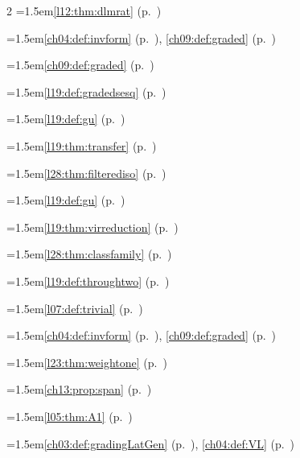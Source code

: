 \begin{multicols}{2}
\hangindent=1.5em\quad \ref{l12:thm:dlmrat} (p.~\pageref{l12:thm:dlmrat})\par
\hangindent=1.5em\quad \ref{ch04:def:invform} (p.~\pageref{ch04:def:invform}), \ref{ch09:def:graded} (p.~\pageref{ch09:def:graded})\par
\hangindent=1.5em\quad \ref{ch09:def:graded} (p.~\pageref{ch09:def:graded})\par
\hangindent=1.5em\quad \ref{l19:def:gradedsesq} (p.~\pageref{l19:def:gradedsesq})\par
\hangindent=1.5em\quad \ref{l19:def:gu} (p.~\pageref{l19:def:gu})\par
\hangindent=1.5em\quad \ref{l19:thm:transfer} (p.~\pageref{l19:thm:transfer})\par
\hangindent=1.5em\quad \ref{l28:thm:filterediso} (p.~\pageref{l28:thm:filterediso})\par
\hangindent=1.5em\quad \ref{l19:def:gu} (p.~\pageref{l19:def:gu})\par
\hangindent=1.5em\quad \ref{l19:thm:virreduction} (p.~\pageref{l19:thm:virreduction})\par
\hangindent=1.5em\quad \ref{l28:thm:classfamily} (p.~\pageref{l28:thm:classfamily})\par
\hangindent=1.5em\quad \ref{l19:def:throughtwo} (p.~\pageref{l19:def:throughtwo})\par
\hangindent=1.5em\quad \ref{l07:def:trivial} (p.~\pageref{l07:def:trivial})\par
\hangindent=1.5em\quad \ref{ch04:def:invform} (p.~\pageref{ch04:def:invform}), \ref{ch09:def:graded} (p.~\pageref{ch09:def:graded})\par
\hangindent=1.5em\quad \ref{l23:thm:weightone} (p.~\pageref{l23:thm:weightone})\par
\hangindent=1.5em\quad \ref{ch13:prop:span} (p.~\pageref{ch13:prop:span})\par
\hangindent=1.5em\quad \ref{l05:thm:A1} (p.~\pageref{l05:thm:A1})\par
\hangindent=1.5em\quad \ref{ch03:def:gradingLatGen} (p.~\pageref{ch03:def:gradingLatGen}), \ref{ch04:def:VL} (p.~\pageref{ch04:def:VL})\par

\end{multicols}
